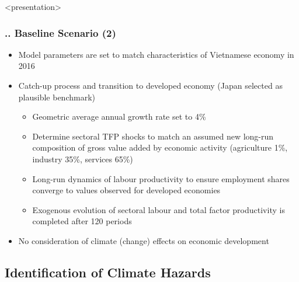 \documentclass[11pt,aspectratio=169]{beamer}
\begin{document}
\begin{frame}<presentation>
	\frametitle{{\thesection.\thesubsection.\thesubsubsection} Baseline Scenario (2)}
	\begin{itemize}
		\item	Model parameters are set to match characteristics of Vietnamese economy in 2016
		\item	Catch-up process and transition to developed economy (Japan selected as plausible benchmark)
		\begin{itemize}
			\item	Geometric average annual growth rate set to 4\% 
			\item	Determine sectoral TFP shocks to match an assumed new long-run composition of gross value added by economic activity (agriculture 1\%, industry 35\%, services 65\%)
			\item	Long-run dynamics of labour productivity to ensure employment shares converge to values observed for developed economies
			\item	Exogenous evolution of sectoral labour and total factor productivity is completed after 120 periods
		\end{itemize}
		\item	No consideration of climate (change) effects on economic development
	\end{itemize}
\end{frame}

\subsection{Identification of Climate Hazards}
\end{document}
